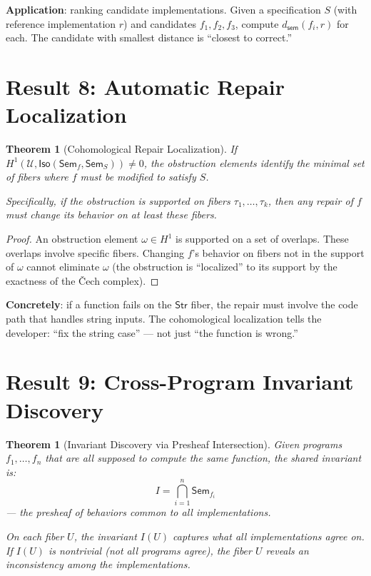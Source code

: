 \documentclass[11pt,a4paper]{report}
\theoremstyle{definition}
\theoremstyle{plain}
\newtheorem{theorem}[definition]{Theorem}
\newcommand{\covers}{\mathcal{U}}
\newcommand{\Sem}{\mathsf{Sem}}
\newcommand{\Iso}{\mathsf{Iso}}
\newcommand{\Hone}{H^1}
\begin{document}
\textbf{Application}: ranking candidate implementations.  Given a
specification $S$ (with reference implementation $r$) and candidates
$f_1, f_2, f_3$, compute $d_\mathsf{sem}(f_i, r)$ for each.
The candidate with smallest distance is ``closest to correct.''

\section{Result 8: Automatic Repair Localization}

\begin{theorem}[Cohomological Repair Localization]
\label{thm:repair}
If $\Hone(\covers, \Iso(\Sem_f, \Sem_S)) \neq 0$, the obstruction
elements identify the \emph{minimal set of fibers} where $f$ must
be modified to satisfy $S$.

Specifically, if the obstruction is supported on fibers
$\tau_1, \ldots, \tau_k$, then any repair of $f$ must change its
behavior on at least these fibers.
\end{theorem}

\begin{proof}
An obstruction element $\omega \in \Hone$ is supported on a set of
overlaps.  These overlaps involve specific fibers.  Changing $f$'s
behavior on fibers not in the support of $\omega$ cannot eliminate
$\omega$ (the obstruction is ``localized'' to its support by the
exactness of the \v{C}ech complex).
\end{proof}

\textbf{Concretely}: if a function fails on the $\mathsf{Str}$ fiber,
the repair must involve the code path that handles string inputs.
The cohomological localization tells the developer: ``fix the string
case'' --- not just ``the function is wrong.''

\section{Result 9: Cross-Program Invariant Discovery}

\begin{theorem}[Invariant Discovery via Presheaf Intersection]
\label{thm:invariant}
Given programs $f_1, \ldots, f_n$ that are all supposed to compute
the same function, the \emph{shared invariant} is:
\[
  I = \bigcap_{i=1}^n \Sem_{f_i}
\]
--- the presheaf of behaviors common to all implementations.

On each fiber $U$, the invariant $I(U)$ captures what all
implementations agree on.  If $I(U)$ is nontrivial (not all
programs agree), the fiber $U$ reveals an inconsistency among the
implementations.
\end{theorem}
\end{document}
